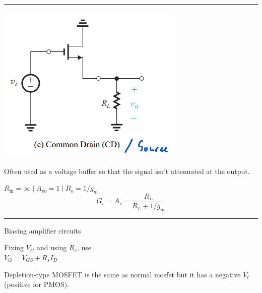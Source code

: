\documentclass[a4paper]{article}
\begin{document}
\begin{multicols*}{3}
\hrule
\includegraphics[width=0.8\linewidth]{imgs/common_drain.png}

Often used as a voltage buffer so that the signal isn't attenuated
at the output.

$R_\text{in}=\infty \mid A_{vo}=1 \mid R_o=1/g_m$
$$G_v=A_v=\frac{R_L}{R_L+1/g_m}$$

\hrule
\vspace{1mm}
Biasing amplifier circuits

Fixing $V_G$ and using $R_s$, use\\
$V_G=V_{GS}+R_sI_D$

\vspace{1cm}
Depletion-type MOSFET is the same as normal mosfet but 
it has a negative $V_t$ (positive for PMOS).
\end{multicols*}
\end{document}
